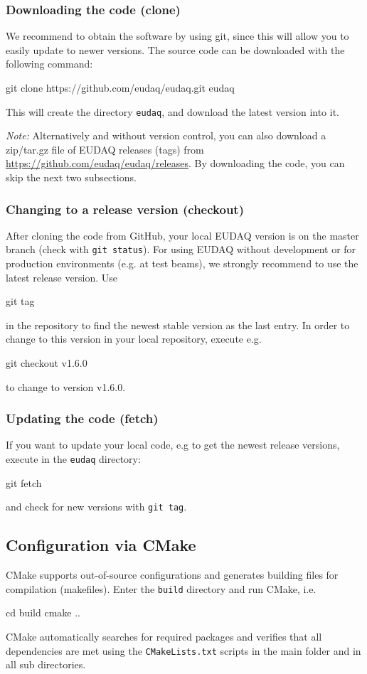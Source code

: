 \subsubsection{Downloading the code (clone)}
We recommend to obtain the software by using git,
since this will allow you to easily update to newer versions.
The source code can be downloaded with the following command:
\begin{listing}[mybash]
git clone https://github.com/eudaq/eudaq.git eudaq
\end{listing}
This will create the directory \texttt{eudaq}, and download the latest
version into it. 

\textit{Note:} Alternatively and without version control, you can also download a zip/tar.gz file of EUDAQ releases (tags) from \url{https://github.com/eudaq/eudaq/releases}. 
By downloading the code, you can skip the next two subsections. 

\subsubsection{Changing to a release version (checkout)}
After cloning the code from GitHub, your local EUDAQ version is on the master branch (check with \texttt{git status}).  
For using EUDAQ without development or for production environments (e.g. at test beams), we strongly recommend to use the latest release version. 
Use 
\begin{listing}[mybash]
git tag 
\end{listing}
in the repository to find the newest stable version as the last entry.
In order to change to this version in your local repository, execute e.g. 
\begin{listing}[mybash]
git checkout v1.6.0
\end{listing}
to change to version v1.6.0.

\subsubsection{Updating the code (fetch)}
If you want to update your local code, e.g to get the newest release versions, execute in the \texttt{eudaq} directory: 
\begin{listing}[mybash]
git fetch
\end{listing}
and check for new versions with \texttt{git tag}. 


\subsection{Configuration via CMake}
CMake supports out-of-source configurations and generates building files for compilation (makefiles). 
Enter the \texttt{build} directory and run CMake, i.e.
\begin{listing}[mybash]
cd build
cmake ..
\end{listing}
CMake automatically searches for required packages and verifies that all dependencies are met using the \texttt{CMakeLists.txt} scripts in the main folder and in all sub directories. 

